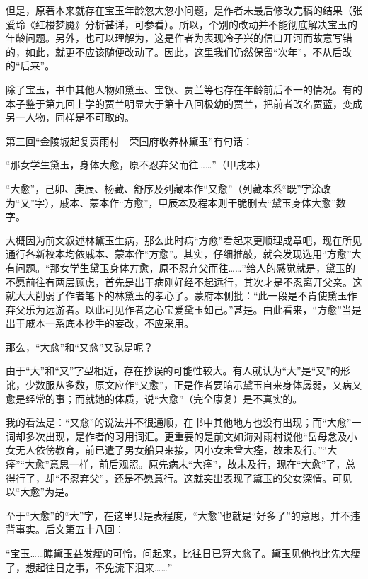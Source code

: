 但是，原著本来就存在宝玉年龄忽大忽小问题，是作者未最后修改完稿的结果（张爱玲《红楼梦魇》分析甚详，可参看）。所以，个别的改动并不能彻底解决宝玉的年龄问题。另外，也可以理解为，这是作者为表现冷子兴的信口开河而故意写错的，如此，就更不应该随便改动了。因此，这里我们仍然保留``次年''，不从后改的``后来''。

除了宝玉，书中其他人物如黛玉、宝钗、贾兰等也存在年龄前后不一的情况。有的本子鉴于第九回上学的贾兰明显大于第十八回极幼的贾兰，把前者改名贾蓝，变成另一人物，同样是不可取的。

{{}}

第三回``金陵城起复贾雨村　荣国府收养林黛玉''有句话：

``那女学生黛玉，身体大愈，原不忍弃父而往\ldots{}\ldots{}''（甲戌本）

``大愈''，己卯、庚辰、杨藏、舒序及列藏本作``又愈''（列藏本系``既''字涂改为``又''字），戚本、蒙本作``方愈''，甲辰本及程本则干脆删去``黛玉身体大愈''数字。

大概因为前文叙述林黛玉生病，那么此时病``方愈''看起来更顺理成章吧，现在所见通行各新校本均依戚本、蒙本作``方愈''。其实，仔细推敲，就会发现选用``方愈''大有问题。``那女学生黛玉身体方愈，原不忍弃父而往\ldots{}\ldots{}''给人的感觉就是，黛玉的不愿前往有两层顾虑，首先是出于病刚好经不起远行，其次才是不忍离开父亲。这就大大削弱了作者笔下的林黛玉的孝心了。蒙府本侧批：``此一段是不肯使黛玉作弃父乐为远游者。以此可见作者之心宝爱黛玉如己。''甚是。由此看来，``方愈''当是出于戚本一系底本抄手的妄改，不应采用。

那么，``大愈''和``又愈''又孰是呢？

由于``大''和``又''字型相近，存在抄误的可能性较大。有人就认为``大''是``又''的形讹，少数服从多数，原文应作``又愈''，正是作者要暗示黛玉自来身体孱弱，又病又愈是经常的事；而就她的体质，说``大愈''（完全康复）是不真实的。

我的看法是：``又愈''的说法并不很通顺，在书中其他地方也没有出现；而``大愈''一词却多次出现，是作者的习用词汇。更重要的是前文如海对雨村说他``岳母念及小女无人依傍教育，前已遣了男女船只来接，因小女未曾大痊，故未及行。''``大痊''``大愈''意思一样，前后观照。原先病未``大痊''，故未及行，现在``大愈''了，总得行了，却``不忍弃父''，还是不愿意行。这就突出表现了黛玉的父女深情。可见以``大愈''为是。

至于``大愈''的``大''字，在这里只是表程度，``大愈''也就是``好多了''的意思，并不违背事实。后文第五十八回：

``宝玉\ldots{}\ldots{}瞧黛玉益发瘦的可怜，问起来，比往日已算大愈了。黛玉见他也比先大瘦了，想起往日之事，不免流下泪来\ldots{}\ldots{}''

